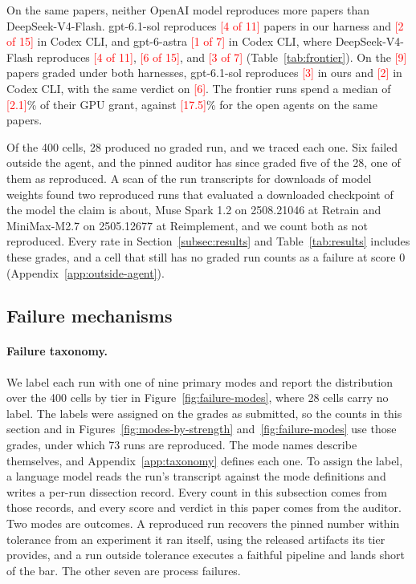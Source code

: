 \documentclass{article} %
\newcommand{\todo}[1]{\textcolor{red}{[#1]}}
\begin{document}
On the same papers, neither OpenAI model reproduces more papers than
DeepSeek-V4-Flash. gpt-6.1-sol reproduces \todo{4 of 11} papers in our harness and
\todo{2 of 15} in Codex CLI, and gpt-6-astra \todo{1 of 7} in Codex CLI, where
DeepSeek-V4-Flash reproduces \todo{4 of 11}, \todo{6 of 15}, and \todo{3 of 7}
(Table~\ref{tab:frontier}). On the \todo{9} papers graded under both harnesses,
gpt-6.1-sol reproduces \todo{3} in ours and \todo{2} in Codex CLI, with the
same verdict on \todo{6}. The frontier runs spend a median of \todo{2.1}\% of
their GPU grant, against \todo{17.5}\% for the open agents on the same papers.

Of the 400 cells, 28 produced no graded run, and we traced each one. Six
failed outside the agent, and the pinned auditor has since graded five of the
28, one of them as reproduced. A scan of the run transcripts for downloads of
model weights found two reproduced runs that evaluated a downloaded checkpoint
of the model the claim is about, Muse Spark 1.2 on 2508.21046 at Retrain and
MiniMax-M2.7 on 2505.12677 at Reimplement, and we count both as not
reproduced. Every rate in Section~\ref{subsec:results} and Table~\ref{tab:results} includes these grades, and a cell that
still has no graded run counts as a failure at score 0
(Appendix~\ref{app:outside-agent}).

\subsection{Failure mechanisms}
\label{subsec:mechanisms}

\paragraph{Failure taxonomy.}
We label each run with one of nine primary modes and report the
distribution over the 400 cells by tier in Figure~\ref{fig:failure-modes}, where
28 cells carry no label. The labels were assigned on the grades as submitted, so the counts in this section and in Figures~\ref{fig:modes-by-strength} and~\ref{fig:failure-modes} use those grades, under which 73 runs are reproduced. The mode names describe
themselves, and Appendix~\ref{app:taxonomy} defines each one. To assign the label, a language model reads the run's
transcript against the mode definitions and writes a per-run dissection
record. Every count in this subsection comes from those records, and every
score and verdict in this paper comes from the auditor. Two modes are outcomes. A
reproduced run recovers the pinned number within tolerance from an experiment
it ran itself, using the released artifacts its tier provides, and a run outside tolerance executes a faithful pipeline
and lands short of the bar. The other seven are process failures.
\end{document}
